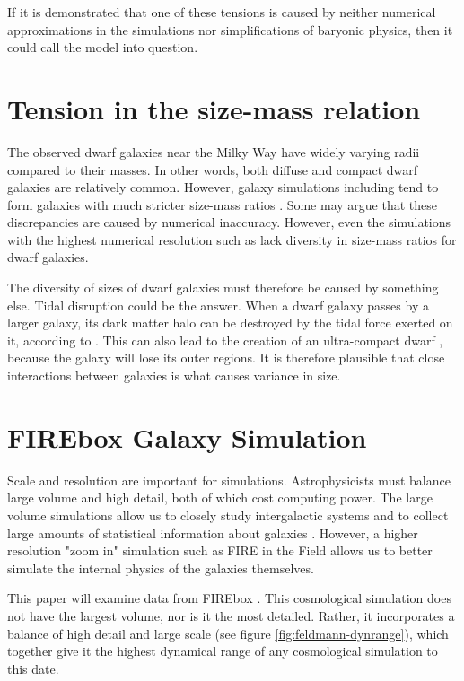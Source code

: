 If it is demonstrated that one of these tensions is caused by neither numerical approximations in the simulations nor simplifications of baryonic physics, then it could call the \lcdm\* model into question.


\section{Tension in the size-mass relation}

The observed dwarf galaxies near the Milky Way have widely varying radii compared to their masses. In other words, both diffuse and compact dwarf galaxies are relatively common. However, galaxy simulations including \cite{fittsFireFieldSimulating2017} tend to form galaxies with much stricter size-mass ratios \citep{salesBaryonicSolutionsChallenges2022}. Some may argue that these discrepancies are caused by numerical inaccuracy. However, even the simulations with the highest numerical resolution such as \cite{wheelerBeItTherefore2019} lack diversity in size-mass ratios for dwarf galaxies. 

The diversity of sizes of dwarf galaxies must therefore be caused by something else. Tidal disruption could be the answer. When a dwarf galaxy passes by a larger galaxy, its dark matter halo can be destroyed by the tidal force exerted on it, according to \cite{morenoGalaxiesLackingDark2022}. This can also lead to the creation of an ultra-compact dwarf \citep{applebaumUltrafaintDwarfsMilky2021}, because the galaxy will lose its outer regions. It is therefore plausible that close interactions between galaxies is what causes variance in size.

\section{FIREbox Galaxy Simulation}
Scale and resolution are important for simulations. Astrophysicists must balance large volume and high detail, both of which cost computing power. The large volume simulations allow us to closely study intergalactic systems and to collect large amounts of statistical information about galaxies \citep{feldmannFIREboxSimulatingGalaxies2022}. However, a higher resolution "zoom in" simulation such as FIRE in the Field \citep{fittsFireFieldSimulating2017} allows us to better simulate the internal physics of the galaxies themselves.

This paper will examine data from FIREbox \citep{feldmannFIREboxSimulatingGalaxies2022}. This cosmological simulation does not have the largest volume, nor is it the most detailed. Rather, it incorporates a balance of high detail and large scale (see figure \ref{fig:feldmann-dynrange}), which together give it the highest dynamical range of any cosmological simulation to this date.



